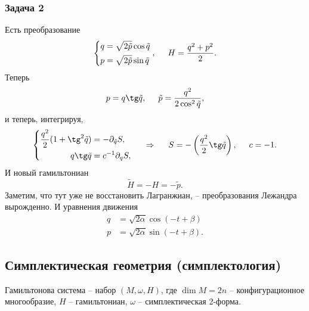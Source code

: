 \subsubsection*{Задача 2}
Есть преобразование
\begin{equation*}
    \left\{\begin{aligned}
        q &= \sqrt{2 \tilde{p}} \cos \tilde{q} \\
        p &= \sqrt{2 \tilde{p}} \sin \tilde{q} \\ 
    \end{aligned}\right.
    ,
    \hspace{5 mm}
    H = \frac{q^2 + p^2}{2}.
\end{equation*}
Теперь 
\begin{equation*}
    p = q \tg \tilde{q}, \hspace{5 mm}
    \tilde{p} = \frac{q^2}{2 \cos^2 \tilde{q}},
\end{equation*}
и теперь, интегрируя,
\begin{equation*}
    \left\{\begin{aligned}
        \frac{q^2}{2} (1 + \tg^2 \tilde{q}) &= - \partial_{\tilde{q}} S, \\
        q \tg \tilde{q} &= c^{-1} \partial_q S,
    \end{aligned}\right.
    \hspace{0.5cm} \Rightarrow \hspace{0.5cm}
    S = - \l(
        \frac{q^2}{2} \tg \tilde{q}
    \r), \hspace{5 mm} c = -1.
\end{equation*}
И новый гамильтониан
\begin{equation*}
    \tilde{H} = - H = -\tilde{p}.
\end{equation*}
Заметим, что тут уже не восстановить Лагранжиан, -- преобразования Лежандра вырожденно. И уравнения движения
\begin{align*}
    q &= \sqrt{2 \alpha} \cos (-t + \beta) \\
    p &= \sqrt{2 \alpha} \sin (-t + \beta).
\end{align*}


\subsection{Симплектическая геометрия (симплектология)}


Гамильтонова система -- набор $(M, \omega, H)$, где $\dim M = 2 n$ -- конфигурационное многообразие, $H$ -- гамильтониан, $\omega$ -- симплектическая 2-форма.

